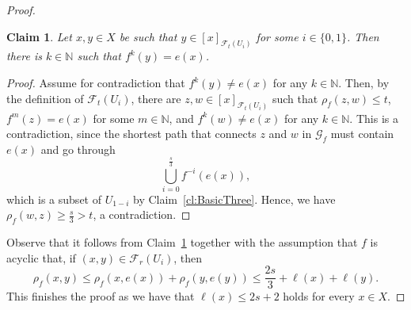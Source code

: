 \documentclass[10pt,a4paper]{amsart}
\newtheorem{claim}{Claim}
\newcommand{\N}{\mathbb N}
\newcommand\mcal{\mathcal}
\begin{document}
\begin{proof}
        \begin{claim}\label{cl:BasicTwo}
            Let $x,y\in X$ be such that $y\in [x]_{\mcal{F}_t(U_i)}$ for some $i\in\{0,1\}$.
            Then there is $k\in \N$ such that $f^k(y)=e(x)$.
        \end{claim}
        \begin{proof}
            Assume for contradiction that $f^k(y)\not= e(x)$ for any $k\in \N$.
            Then, by the definition of $\mcal{F}_t(U_i)$, there are $z,w\in [x]_{\mcal{F}_t(U_i)}$ such that $\rho_f(z,w)\le t$, $f^m(z)=e(x)$ for some $m\in \mathbb{N}$, and $f^k(w)\not= e(x)$ for any $k\in \N$.
            This is a contradiction, since the shortest path that connects $z$ and $w$ in $\mathcal{G}_f$ must contain $e(x)$ and go through
            $$\bigcup_{i=0}^{\frac{s}{3}} f^{-i}(e(x)),$$
            which is a subset of $U_{1 - i}$ by Claim~\ref{cl:BasicThree}.
            Hence, we have $\rho_f(w,z)\ge \frac{s}{3}>t$, a contradiction.         
        \end{proof}

        Observe that it follows from Claim~\ref{cl:BasicTwo} together with the assumption that $f$ is acyclic that, if $(x, y) \in \mcal{F}_r(U_i)$, then
        $$\rho_f(x,y)\le \rho_f(x,e(x))+\rho_f(y,e(y))\le \frac{2s}{3}+\ell(x)+\ell(y).$$
        This finishes the proof as we have that $\ell(x)\le 2s+2$ holds for every $x\in X$.
    \end{proof}
\end{document}
